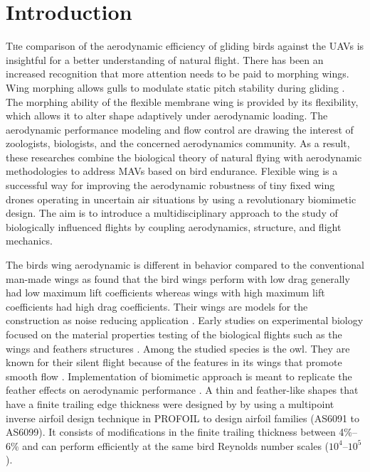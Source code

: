 \section{Introduction}

\lettrine{T}he comparison of the aerodynamic efficiency of gliding birds against the UAVs is insightful for a better understanding of natural flight. There has been an increased recognition that more attention needs to be paid to morphing wings. Wing morphing allows gulls to modulate static pitch stability during gliding \cite{Harvey2022BirdsMorphing}. 
The morphing ability of the flexible membrane wing is provided by its flexibility, which allows it to alter shape adaptively under aerodynamic loading. The aerodynamic performance modeling and flow control are drawing the interest of zoologists, biologists, and the concerned aerodynamics community. As a result, these researches combine the biological theory of natural flying with aerodynamic methodologies to address MAVs based on bird endurance. Flexible wing is a successful way for improving the aerodynamic robustness of tiny fixed wing drones operating in uncertain air situations by using a revolutionary biomimetic design.
The aim is to introduce a multidisciplinary approach to the study of biologically influenced flights by coupling aerodynamics, structure, and flight mechanics.

The birds wing aerodynamic is different in behavior compared to the conventional man-made wings as \citet{Withers1981} found that the bird wings perform with low drag generally had low maximum lift coefficients whereas wings with high maximum lift coefficients had high drag coefficients. 
Their wings are models for the construction as noise reducing application \cite{Bachmann2010}.
Early studies on experimental biology focused on the material properties testing of the biological flights such as the wings and feathers structures \cite{Bachmann2012}.
Among the studied species is the owl. They are known for their silent flight because of the features in its wings that promote smooth flow \cite{Jaworski2020,Wagner2017,Geyer2016}. 
Implementation of biomimetic approach is meant to replicate the feather effects on aerodynamic performance \cite{Hedenstrom2017}. 
%
A thin and feather-like shapes that have a finite trailing edge thickness were designed by \citet{Ananda2018} by using a multipoint inverse airfoil design technique in PROFOIL \cite{AirfoilDesignSoftwarefortheWeb} to design airfoil families (AS6091 to AS6099).
%
It consists of modifications in the finite trailing thickness between 4\%–6\% and can perform efficiently at the same bird Reynolds number scales ($10^4$–$10^5$).
%

